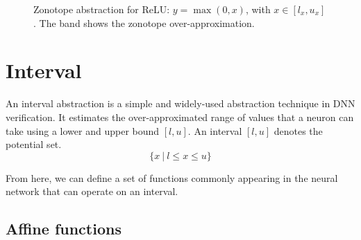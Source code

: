 \documentclass[oneside,11pt,dvipsnames]{book}
\numberwithin{equation}{section}
\theoremstyle{definition}
\theoremstyle{remark}
\newcommand{\tvn}[1]{\iftoggle{usecomment}{{\color{red}{[TVN]: #1}}}{}}
\begin{document}
\begin{figure}[h]
\begin{subfigure}{0.49\linewidth}
    \end{subfigure}

    \caption{Zonotope abstraction for ReLU: $y = \max(0,x)$, with $x \in [l_x, u_x]$. The band shows the zonotope over-approximation.}
    \label{fig:relu-zonotope-abstraction}
\end{figure}


\tvn{Hai, create concrete examples with numbers to show how the abstractions work, e.g., for interval, zonotope, polytope, etc. We want to use one example to show the differences in the approximation,  not multiple examples which would be less effective.}
\section{Interval}

An interval abstraction is a simple and widely-used abstraction technique in DNN verification. It estimates the over-approximated range of values that a neuron can take using a lower and upper bound $[l, u]$. An interval $[l, u]$ denotes the potential set.
$$\{x \ | \ l \leq x \leq u\}$$

From here, we can define a set of functions commonly appearing in the neural network that can operate on an interval.

\subsection{Affine functions}
\end{document}
